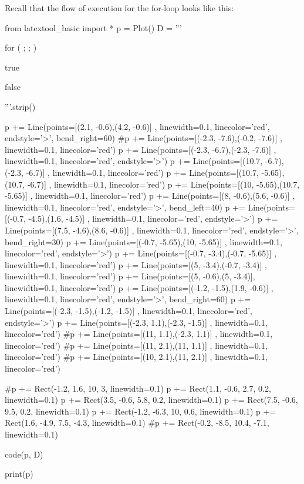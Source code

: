 Recall that the flow of execution for the for-loop looks like this:
\begin{python}
from latextool_basic import *
p = Plot()
D = '''





for (         ;               ;                  )








true
         
               
false





'''.strip()

p += Line(points=[(2.1, -0.6),(4.2, -0.6)] , linewidth=0.1, linecolor='red', endstyle='>', bend_right=60)
#p += Line(points=[(-2.3, -7.6),(-0.2, -7.6)] , linewidth=0.1, linecolor='red')
p += Line(points=[(-2.3, -6.7),(-2.3, -7.6)] , linewidth=0.1, linecolor='red', endstyle='>')
p += Line(points=[(10.7, -6.7),(-2.3, -6.7)] , linewidth=0.1, linecolor='red')
p += Line(points=[(10.7, -5.65), (10.7, -6.7)] , linewidth=0.1, linecolor='red')
p += Line(points=[(10, -5.65),(10.7, -5.65)] , linewidth=0.1, linecolor='red')
p += Line(points=[(8, -0.6),(5.6, -0.6)] , linewidth=0.1, linecolor='red', endstyle='>', bend_left=40)
p += Line(points=[(-0.7, -4.5),(1.6, -4.5)] , linewidth=0.1, linecolor='red', endstyle='>')
p += Line(points=[(7.5, -4.6),(8.6, -0.6)] , linewidth=0.1, linecolor='red', endstyle='>', bend_right=30)
p += Line(points=[(-0.7, -5.65),(10, -5.65)] , linewidth=0.1, linecolor='red', endstyle='>')
p += Line(points=[(-0.7, -3.4),(-0.7, -5.65)] , linewidth=0.1, linecolor='red')
p += Line(points=[(5, -3.4),(-0.7, -3.4)] , linewidth=0.1, linecolor='red')
p += Line(points=[(5, -0.6),(5, -3.4)], linewidth=0.1, linecolor='red')
p += Line(points=[(-1.2, -1.5),(1.9, -0.6)] , linewidth=0.1, linecolor='red', endstyle='>', bend_right=60)
p += Line(points=[(-2.3, -1.5),(-1.2, -1.5)] , linewidth=0.1, linecolor='red', endstyle='>')
p += Line(points=[(-2.3, 1.1),(-2.3, -1.5)] , linewidth=0.1, linecolor='red')
#p += Line(points=[(11, 1.1),(-2.3, 1.1)] , linewidth=0.1, linecolor='red')
#p += Line(points=[(11, 2.1),(11, 1.1)] , linewidth=0.1, linecolor='red')
#p += Line(points=[(10, 2.1),(11, 2.1)] , linewidth=0.1, linecolor='red')

#p += Rect(-1.2, 1.6, 10, 3, linewidth=0.1)
p += Rect(1.1, -0.6, 2.7, 0.2, linewidth=0.1)
p += Rect(3.5, -0.6, 5.8, 0.2, linewidth=0.1)
p += Rect(7.5, -0.6, 9.5, 0.2, linewidth=0.1)
p += Rect(-1.2, -6.3, 10, 0.6, linewidth=0.1)
p += Rect(1.6, -4.9, 7.5, -4.3, linewidth=0.1)
#p += Rect(-0.2, -8.5, 10.4, -7.1, linewidth=0.1)

code(p, D)

print(p)
\end{python}

